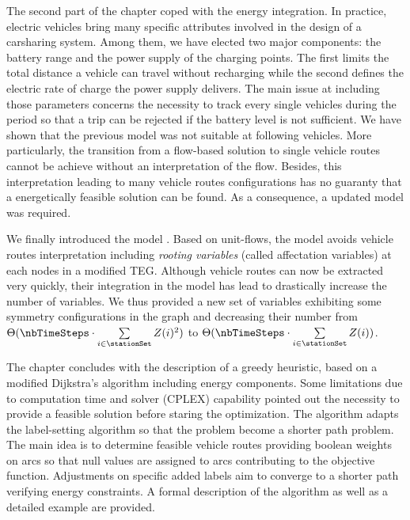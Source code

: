 \begin{bibunit}[ieeetr]
\medskip
The second part of the chapter coped with the energy integration.
In practice, electric vehicles bring many specific attributes involved in the design of a carsharing system.
Among them, we have elected two major components: the battery range and the power supply of the charging points.
The first limits the total distance a vehicle can travel without recharging while the second defines the electric rate of charge the power supply delivers.
The main issue at including those parameters concerns the necessity to track every single vehicles during the period so that a trip can be rejected if the battery level is not sufficient.
We have shown that the previous model {\SLP} was not suitable at following vehicles.
More particularly, the transition from a flow-based solution to single vehicle routes cannot be achieve without an interpretation of the flow.
Besides, this interpretation leading to many vehicle routes configurations has no guaranty that a energetically feasible solution can be found.
As a consequence, a updated model was required.

\medskip
We finally introduced the model {\ENERGY}.
Based on unit-flows, the model avoids vehicle routes interpretation including \emph{rooting variables} (called affectation variables) at each nodes in a modified TEG.
Although vehicle routes can now be extracted very quickly, their integration in the model has lead to drastically increase the number of variables.
We thus provided a new set of variables exhibiting some symmetry configurations in the graph and decreasing their number from $\Theta (\nbTimeSteps \cdot \sum\limits_{i \in \stationSet} Z(i)^2)$ to $\Theta (\nbTimeSteps \cdot \sum\limits_{i \in \stationSet} Z(i))$.

\medskip
The chapter concludes with the description of a greedy heuristic, based on a modified Dijkstra's algorithm including energy components.
Some limitations due to computation time and solver (CPLEX) capability pointed out the necessity to provide a feasible solution before staring the optimization.
The algorithm adapts the label-setting algorithm so that the problem become a shorter path problem.
The main idea is to determine feasible vehicle routes providing boolean weights on arcs so that null values are assigned to arcs contributing to the objective function.
Adjustments on specific added labels aim to converge to a shorter path verifying energy constraints.
A formal description of the algorithm as well as a detailed example are provided.



\end{bibunit}
